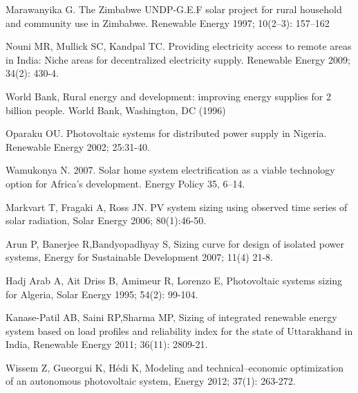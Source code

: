 \documentclass{article}
\begin{document}
\begin{thebibliography}{9}

 Marawanyika G. The Zimbabwe UNDP-G.E.F solar project for rural household and community use in Zimbabwe. Renewable Energy 1997; 10(2–3): 157–162

 Nouni MR, Mullick SC, Kandpal TC. Providing electricity access to remote areas in India: Niche areas for decentralized electricity supply. Renewable Energy 2009; 34(2): 430-4.

 World Bank, Rural energy and development: improving energy supplies for 2 billion people. World Bank, Washington, DC (1996)

Oparaku OU. Photovoltaic systems for distributed power supply in Nigeria. Renewable Energy 2002; 25:31-40.

 Wamukonya N. 2007. Solar home system electrification as a viable technology option for Africa’s development. Energy Policy 35, 6–14.

 Markvart T, Fragaki A, Ross JN. PV system sizing using observed time series of solar radiation, Solar Energy 2006; 80(1):46-50.

 Arun P, Banerjee R,Bandyopadhyay S, Sizing curve for design of isolated power systems, Energy for Sustainable Development 2007; 11(4) 21-8.

 Hadj Arab A, Ait Driss B, Amimeur R, Lorenzo E, Photovoltaic systems sizing for Algeria, Solar Energy 1995; 54(2): 99-104.

 Kanase-Patil AB, Saini RP,Sharma MP, Sizing of integrated renewable energy system based on load profiles and reliability index for the state of Uttarakhand in India, Renewable Energy 2011; 36(11): 2809-21.

 Wissem Z, Gueorgui K, Hédi K, Modeling and technical–economic optimization of an autonomous photovoltaic system, Energy 2012; 37(1): 263-272.


\end{thebibliography}
\end{document}
